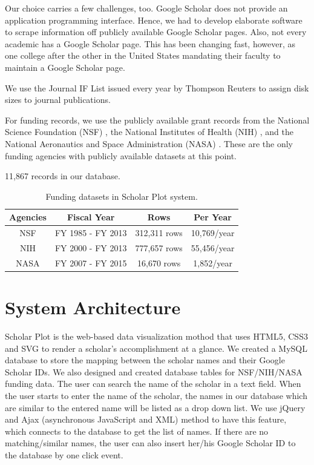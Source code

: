 Our choice carries a few challenges, too. Google Scholar does not provide an application programming interface. Hence, we had to develop elaborate software to scrape information off publicly available Google Scholar pages. Also, not every academic has a Google Scholar page. This has been changing fast, however, as one college after the other in the United States mandating their faculty to maintain a Google Scholar page.

We use the Journal IF List issued every year by Thompson Reuters to assign disk sizes to journal publications.

For funding records, we use the publicly available grant records from the National Science Foundation (NSF) \cite{nsf}, the National Institutes of Health (NIH) \cite{nih}, and the National Aeronautics and Space Administration (NASA) \cite{nasa}. These are the only funding agencies with publicly available datasets at this point.

11,867 records in our database.

\begin{table}[h!]
\centering
\begin{tabular}{||c c c c||}
 \hline
 Agencies & Fiscal Year & Rows & Per Year \\ [1ex]
 \hline\hline
 NSF & FY 1985 - FY 2013 & 312,311 rows & 10,769/year \\
 NIH & FY 2000 - FY 2013 & 777,657 rows & 55,456/year \\
 NASA & FY 2007 - FY 2015 & 16,670 rows & 1,852/year \\ [1ex]
 \hline
\end{tabular}
\caption{Funding datasets in Scholar Plot system.}
\label{table:1}
\end{table}









\section{System Architecture}


Scholar Plot is the web-based data visualization mothod that uses HTML5, CSS3 and SVG to render a scholar's accomplishment at a glance. We created a MySQL database to store the mapping between the scholar names and their Google Scholar IDs. We also designed and created database tables for NSF/NIH/NASA funding data. The user can search the name of the scholar in a text field. When the user starts to enter the name of the scholar, the names in our database which are similar to the entered name will be listed as a drop down list. We use jQuery and Ajax (asynchronous JavaScript and XML) method to have this feature, which connects to the database to get the list of names. If there are no matching/similar names, the user can also insert her/his Google Scholar ID to the database by one click event.

